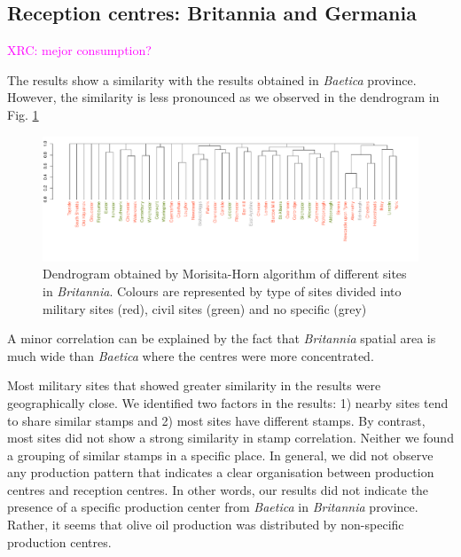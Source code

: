\documentclass[review]{elsarticle}
\newcommand{\memo}[2]{\textcolor{#1}{#2}}
\newcommand{\xavi}[1]{\memo{magenta}{XRC: #1\\}}
\begin{document}
\subsection{Reception centres: Britannia and Germania}
\xavi{mejor consumption?}

The results show a similarity with the results obtained in \textit{Baetica} province. However, the similarity is less pronounced as we observed in the dendrogram in Fig. \ref{britmap}


\begin{figure}
	\centering
\includegraphics[width=\linewidth]{figs/dendrobrit5.pdf}
\caption{Dendrogram obtained by Morisita-Horn algorithm of different sites in \textit{Britannia}. Colours are represented by type of sites divided into military sites (red), civil sites (green) and no specific (grey)}
\label{britmap}
\end{figure}


A minor correlation can be explained by the fact that \textit{Britannia} spatial area is much wide than \textit{Baetica} where the centres were more concentrated.

Most military sites that showed greater similarity in the results were geographically close. We identified two factors in the results: 1) nearby sites tend to share similar stamps and 2) most sites have different stamps. 
By contrast, most sites did not show a strong similarity in stamp correlation. Neither we found a grouping of similar stamps in a specific place. In general, we did not observe any production pattern that indicates a clear organisation between production centres and reception centres. In other words, our results did not indicate the presence of a specific production center from \textit{Baetica} in \textit{Britannia} province. Rather, it seems that olive oil production was distributed by non-specific production centres. 
\end{document}
